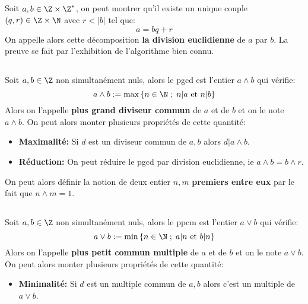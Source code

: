 \subsection*{}
Soit \(a, b \in \Z \times \Z^*\), on peut montrer qu'il existe un unique couple \((q, r) \in \Z \times \N\) avec \(r < |b|\) tel que:
\[ 
    a = bq + r
\]
On appelle alors cette décomposition \textbf{la division euclidienne} de \(a\) par \(b\). La preuve se fait par l'exhibition de l'algorithme bien connu.

\subsection*{}
Soit \(a, b \in \Z\) non simultanément nuls, alors le pgcd est l'entier \(a \wedge b\) qui vérifie:
\[ 
    a \wedge b := \max \left\{ n \in \N \; ; \; n | a \text{ et } n | b \right\} 
\]
Alors on l'appelle \textbf{plus grand diviseur commun} de \(a\) et de \(b\) et on le note \(a \wedge b\). On peut alors monter plusieurs propriétés de cette quantité:
\begin{itemize}
   \item \textbf{Maximalité:} Si \( d \) est un diviseur commun de \( a, b \) alors \( d | a \wedge b \).
   \item \textbf{Réduction:} On peut réduire le pgcd par division euclidienne, ie \( a \wedge b = b \wedge r \).
\end{itemize}
On peut alors définir la notion de deux entier \( n, m \) \textbf{premiers entre eux} par le fait que \( n \wedge m = 1 \).

\subsection*{}
Soit \(a, b \in \Z\) non simultanément nuls, alors le ppcm est l'entier \(a \vee b\) qui vérifie:
\[ 
    a \vee b := \min \left\{ n \in \N \; ; \; a | n \text{ et } b | n \right\} 
\]
Alors on l'appelle \textbf{plus petit commun multiple} de \(a\) et de \(b\) et on le note \(a \vee b\). On peut alors monter plusieurs propriétés de cette quantité:
\begin{itemize}
    \item \textbf{Minimalité:} Si \( d \) est un multiple commun de \( a, b \) alors c'est un multiple de \( a \vee b\).
 \end{itemize}

